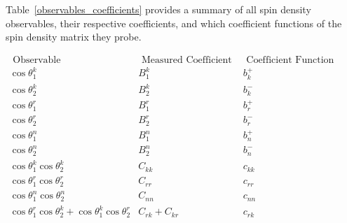 Table~\ref{observables_coefficients} provides a summary of all spin density observables, their respective coefficients, and which coefficient functions of the spin density matrix they probe.
\begin{table}[htb]
\begin{center}
\begin{adjustbox}{scale=0.85,center}
\begin{math}
\begin{array}{l|l|l}
\hline \text { Observable } & \text { Measured Coefficient } & \text { Coefficient Function } \\
\hline 
\cos \theta_1^k & B_1^k & b_k^{+} \\
\cos \theta_2^k & B_2^k & b_k^{-} \\
\cos \theta_1^r & B_1^r & b_r^{+} \\
\cos \theta_2^r & B_2^r & b_r^{-} \\
\cos \theta_1^n & B_1^n & b_n^{+} \\
\cos \theta_2^n & B_2^n & b_n^{-} \\
\hline 
\cos \theta_1^k \cos \theta_2^k & C_{k k} & c_{k k} \\
\cos \theta_1^r \cos \theta_2^r & C_{r r} & c_{r r} \\
\cos \theta_1^n \cos \theta_2^n & C_{n n} & c_{n n} \\
\hline 
\cos \theta_1^r \cos \theta_2^k+\cos \theta_1^k \cos \theta_2^r & C_{r k}+C_{k r} & c_{r k} \\

\end{array}
\end{math}
\end{adjustbox}
\end{center}
\end{table}
